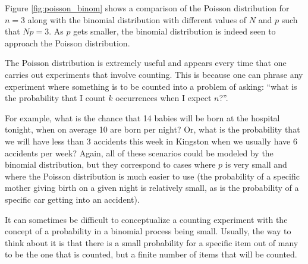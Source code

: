 
Figure \ref{fig:poisson_binom} shows a comparison of the Poisson distribution for $n=3$ along with the binomial distribution with different values of $N$ and $p$ such that $Np=3$. As $p$ gets smaller, the binomial distribution is indeed seen to approach the Poisson distribution.


The Poisson distribution is extremely useful and appears every time that one carries out experiments that involve counting. This is because one can phrase any experiment where something is to be counted into a problem of asking: ``what is the probability that I count $k$ occurrences when I expect $n$?''.

For example, what is the chance that 14 babies will be born at the hospital tonight, when on average 10 are born per night? Or, what is the probability that we will have less than 3 accidents this week in Kingston when we usually have 6 accidents per week? Again, all of these scenarios could be modeled by the binomial distribution, but they correspond to cases where $p$ is very small and where the Poisson distribution is much easier to use (the probability of a specific mother giving birth on a given night is relatively small, as is the probability of a specific car getting into an accident).

It can sometimes be difficult to conceptualize a counting experiment with the concept of a probability in a binomial process being small. Usually, the way to think about it is that there is a small probability for a specific item out of many to be the one that is counted, but a finite number of items that will be counted. 

